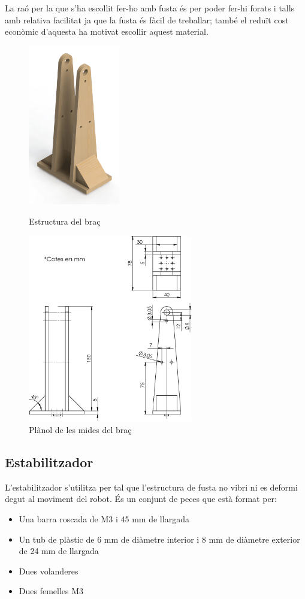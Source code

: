 \documentclass[a4paper, 12pt]{article}
\begin{document}
La raó per la que s'ha escollit fer-ho amb fusta és per poder fer-hi forats i talls amb relativa facilitat ja que la fusta és fàcil de treballar; també el reduït cost econòmic d'aquesta ha motivat escollir aquest material.
\begin{figure}[h!]
\begin{minipage}[b]{.45\linewidth}
\centering
\includegraphics[height=7cm]{./imgComp/estructura}
\caption{Estructura del braç}
\end{minipage}
\begin{minipage}[b]{.45\linewidth}
\centering
\includegraphics[height=8.2cm]{./sketch/estructura}
\caption{Plànol de les mides del braç}
\end{minipage}
\end{figure}

\subsection{Estabilitzador}
L'estabilitzador s'utilitza per tal que l'estructura de fusta no vibri ni es deformi degut al moviment del robot. 
És un conjunt de peces que està format per:
\begin{itemize}
\item Una barra roscada de M3 i 45 mm de llargada

\item Un tub de plàstic de 6 mm de diàmetre interior i 8 mm de diàmetre exterior de 24 mm de llargada

\item Dues volanderes

\item Dues femelles M3
\end{itemize}
\end{document}
